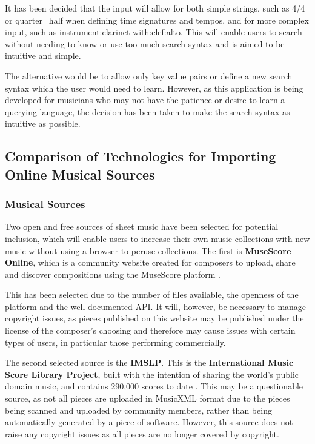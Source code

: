 It has been decided that the input will allow for both simple strings, such as 4/4 or quarter=half when defining time signatures and tempos, and for more complex input, such as instrument:clarinet with:clef:alto. This will enable users to search without needing to know or use too much search syntax and is aimed to be intuitive and simple.

The alternative would be to allow only key value pairs or define a new search syntax which the user would need to learn. However, as this application is being developed for musicians who may not have the patience or desire to learn a querying language, the decision has been taken to make the search syntax as intuitive as possible.

\subsection{Comparison of Technologies for Importing Online Musical Sources}
\subsubsection{Musical Sources}
Two open and free sources of sheet music have been selected for potential inclusion, which will enable users to increase their own music collections with new music without using a browser to peruse collections. The first is \textbf{MuseScore Online}, which is a community website created for composers to upload, share and discover compositions using the MuseScore platform \parencite{MuseShare}.

This has been selected due to the number of files available, the openness of the platform and the well documented API. It will, however, be necessary to manage copyright issues, as pieces published on this website may be published under the license of the composer's choosing and therefore may cause issues with certain types of users, in particular those performing commercially.

The second selected source is the \textbf{IMSLP}. This is the \textbf{International Music Score Library Project}, built with the intention of sharing the world’s public domain music, and contains 290,000 scores to date \parencite{imslp}. This may be a questionable source, as not all pieces are uploaded in MusicXML format due to the pieces being scanned and uploaded by community members, rather than being automatically generated by a piece of software. However, this source does not raise any copyright issues as all pieces are no longer covered by copyright.

